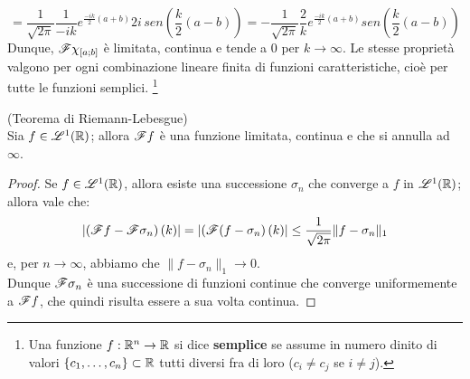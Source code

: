 $$=\frac{1}{\sqrt{2 \pi}} \frac{1}{-ik} e^{\frac{-ik}{2}(a+b)} 2i \, sen\left(\frac{k}{2} (a-b) \right)= - \frac{1}{\sqrt{2 \pi}} \frac{2}{k} e^{\frac{-ik}{2}(a+b)} sen\left(\frac{k}{2} (a-b) \right)$$
Dunque, $ \mathscr{F} \chi_{[a;b]}$ è limitata, continua e tende a $0$ per $k \to \infty$. Le stesse proprietà valgono per ogni combinazione lineare finita di funzioni caratteristiche, cioè per tutte le funzioni semplici. \footnote{Una funzione $f:\mathbb{R}^n \to \mathbb{R}$ si dice \textbf{semplice} se assume in numero dinito di valori $\{c_1, \dots, c_n \} \subset \mathbb{R}$ tutti diversi fra di loro ($c_i \neq c_j$ se $i \neq j$).}
\begin{teorema}(Teorema di Riemann-Lebesgue)\\
Sia $f \in \mathscr{L}^1(\mathbb{R})$; allora $\mathscr{F} f$ è una funzione limitata, continua e che si annulla ad $\infty$.
\end{teorema}
\begin{proof}
Se $f \in \mathscr{L}^1(\mathbb{R})$, allora esiste una successione $\sigma_n$ che converge a $f$ in $\mathscr{L}^1(\mathbb{R})$; allora vale che:
$$\left| \left( \mathscr{F} f - \mathscr{F} \sigma_n \right) (k) \right|=\left| \left( \mathscr{F} (f - \sigma_n \right) (k) \right| \leq  \frac{1}{\sqrt{2 \pi}} \|f - \sigma_n \|_1$$
e, per $n \to \infty$, abbiamo che $\|f - \sigma_n \|_1 \to 0$.\\
Dunque $\mathscr{F} \sigma_n$ è una successione di funzioni continue che converge uniformemente a $\mathscr{F} f$, che quindi risulta essere a sua volta continua.
\end{proof}


















